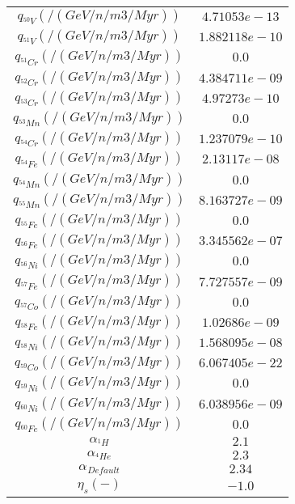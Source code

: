 \begin{tabular}{c |c}
	$q_{^{50}V} (/(GeV/n/m3/Myr))$ & $4.71053e-13$ \\ 
	$q_{^{51}V} (/(GeV/n/m3/Myr))$ & $1.882118e-10$ \\ 
	$q_{^{51}Cr} (/(GeV/n/m3/Myr))$ & $0.0$ \\ 
	$q_{^{52}Cr} (/(GeV/n/m3/Myr))$ & $4.384711e-09$ \\ 
	$q_{^{53}Cr} (/(GeV/n/m3/Myr))$ & $4.97273e-10$ \\ 
	$q_{^{53}Mn} (/(GeV/n/m3/Myr))$ & $0.0$ \\ 
	$q_{^{54}Cr} (/(GeV/n/m3/Myr))$ & $1.237079e-10$ \\ 
	$q_{^{54}Fe} (/(GeV/n/m3/Myr))$ & $2.13117e-08$ \\ 
	$q_{^{54}Mn} (/(GeV/n/m3/Myr))$ & $0.0$ \\ 
	$q_{^{55}Mn} (/(GeV/n/m3/Myr))$ & $8.163727e-09$ \\ 
	$q_{^{55}Fe} (/(GeV/n/m3/Myr))$ & $0.0$ \\ 
	$q_{^{56}Fe} (/(GeV/n/m3/Myr))$ & $3.345562e-07$ \\ 
	$q_{^{56}Ni} (/(GeV/n/m3/Myr))$ & $0.0$ \\ 
	$q_{^{57}Fe} (/(GeV/n/m3/Myr))$ & $7.727557e-09$ \\ 
	$q_{^{57}Co} (/(GeV/n/m3/Myr))$ & $0.0$ \\ 
	$q_{^{58}Fe} (/(GeV/n/m3/Myr))$ & $1.02686e-09$ \\ 
	$q_{^{58}Ni} (/(GeV/n/m3/Myr))$ & $1.568095e-08$ \\ 
	$q_{^{59}Co} (/(GeV/n/m3/Myr))$ & $6.067405e-22$ \\ 
	$q_{^{59}Ni} (/(GeV/n/m3/Myr))$ & $0.0$ \\ 
	$q_{^{60}Ni} (/(GeV/n/m3/Myr))$ & $6.038956e-09$ \\ 
	$q_{^{60}Fe} (/(GeV/n/m3/Myr))$ & $0.0$ \\ 
	$\alpha_{^{1}H}$ & $2.1$ \\ 
	$\alpha_{^{4}He}$ & $2.3$ \\ 
	$\alpha_{^{}Default}$ & $2.34$ \\ 
	$\eta_s  (-)$ & $-1.0$ \\ 
\end{tabular}


